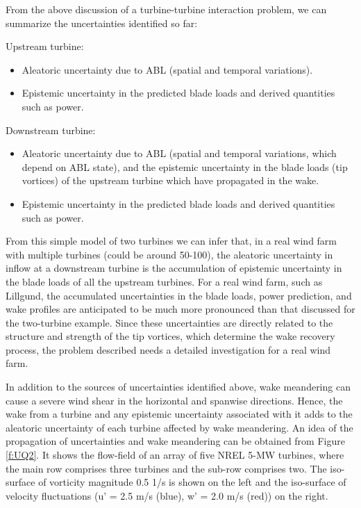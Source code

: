 \documentclass[]{aiaa-tc}%
\begin{document}
From the above discussion of a turbine-turbine interaction problem, we can summarize the uncertainties identified so far:

Upstream turbine: 
\begin{itemize}
  \item Aleatoric uncertainty due to ABL (spatial and temporal variations).
  \item Epistemic uncertainty in the predicted blade loads and derived quantities such as power.
\end{itemize}

Downstream turbine: 
\begin{itemize}
  \item Aleatoric uncertainty due to ABL (spatial and temporal variations, which depend on ABL state), and the epistemic uncertainty in the blade loads (tip vortices) of the upstream turbine which have propagated in the wake.
  \item Epistemic uncertainty in the predicted blade loads and derived quantities such as power.
\end{itemize}

From this simple model of two turbines we can infer that, in a real wind farm with multiple turbines (could be around 50-100), the aleatoric uncertainty in inflow at a downstream turbine is the accumulation of epistemic uncertainty in the blade loads of all the upstream turbines. For a real wind farm, such as Lillgund,\cite{churchfield:aiaa2012} the accumulated uncertainties in the blade loads, power prediction, and wake profiles are anticipated to be much more pronounced than that discussed for the two-turbine example. Since these uncertainties are directly related to the structure and strength of the tip vortices, which determine the wake recovery process, the problem described needs a detailed investigation for a real wind farm.

In addition to the sources of uncertainties identified above, wake meandering can cause a severe wind shear in the horizontal and spanwise directions. Hence, the wake from a turbine and any epistemic uncertainty associated with it adds to the aleatoric uncertainty of each turbine affected by wake meandering. An idea of the propagation of uncertainties and wake meandering can be obtained from Figure \ref{f:UQ2}. It shows the flow-field of an array of five NREL 5-MW turbines, where the main row comprises three turbines and the sub-row comprises two. The iso-surface of vorticity magnitude 0.5 1/s is shown on the left and the iso-surface of velocity fluctuations (u’ = 2.5 m/s (blue), w’ = 2.0 m/s (red)) on the right. 
\end{document}
